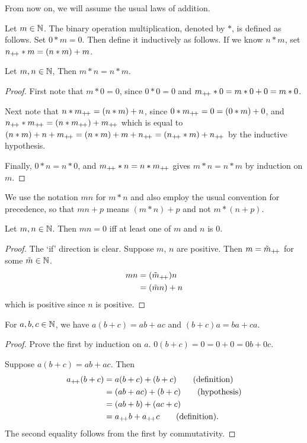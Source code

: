 From now on, we will assume the usual laws of addition.
\begin{definition}[Multiplication] \label{def:N:multiplication}
    Let $m \in \mathbb{N}$.
    The binary operation multiplication, denoted by $*$, is defined as follows.
    Set $0 * m = 0$.
    Then define it inductively as follows.
    If we know $n * m$, set $n_{+\!+} * m = (n * m) + m$.
\end{definition}

\begin{lemma}
    Let $m, n \in \mathbb{N}$,
    Then $m * n = n * m$.
\end{lemma}
\begin{proof}
    First note that $m * 0 = 0$, since $0 * 0 = 0$ and
    $m_{+\!+} * 0 = m * 0 + 0 = m * 0$.

    Next note that $n * m_{+\!+} = (n * m) + n$, since $0 * m_{+\!+} = 0 = (0 * m) + 0$,
    and $n_{+\!+} * m_{+\!+} = (n * m_{+\!+}) + m_{+\!+}$ which is equal to
    $(n * m) + n + m_{+\!+} = (n * m) + m + n_{+\!+} = (n_{+\!+} * m) + n_{+\!+}$ by the
    inductive hypothesis.

    Finally, $0 * n = n * 0$, and $m_{+\!+} * n = n * m_{+\!+}$ gives
    $m * n = n * m$ by induction on $m$.
\end{proof}

We use the notation $m n$ for $m * n$ and also employ the usual convention for
precedence, so that $m n + p$ means $(m * n) + p$ and not $m * (n + p)$.
\begin{lemma}
    Let $m, n \in \mathbb{N}$.
    Then $m n = 0$ iff at least one of $m$ and $n$ is $0$.
\end{lemma}
\begin{proof}
    The `if' direction is clear.
    Suppose $m$, $n$ are positive.
    Then $m = \tilde{m}_{+\!+}$ for some $\tilde{m} \in \mathbb{N}$.
    \begin{align*}
        m n &= (\tilde{m}_{+\!+}) n \\
            &= (\tilde{m} n) + n
    \end{align*}
    which is positive since $n$ is positive.
\end{proof}

\begin{proposition}[Distributivity] \label{thm:distributivity}
    For $a, b, c \in \mathbb{N}$, we have $a(b + c) = ab + ac$ and $(b + c)a = ba + ca$.
\end{proposition}
\begin{proof}
    Prove the first by induction on $a$.
    $0(b + c) = 0 = 0 + 0 = 0b + 0c$.

    Suppose $a(b + c) = ab + ac$.
    Then \begin{align*}
        a_{+\!+}(b + c) &= a(b + c) + (b + c) \tag{definition} \\
                    &= (ab + ac) + (b + c) \tag{hypothesis} \\
                    &= (ab + b) + (ac + c) \\
                    &= a_{+\!+} b + a_{+\!+} c \tag{definition}.
    \end{align*}
    The second equality follows from the first by commutativity.
\end{proof}

